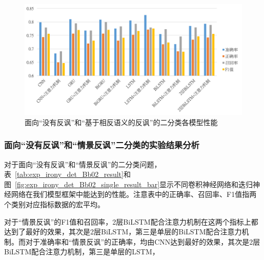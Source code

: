 \begin{figure}[H]
  \centering
  \includegraphics[width=\textwidth]{img/exp_irony_det_Bb01_single_result_bar.png}
  \caption{面向“没有反讽”和“基于相反语义的反讽”的二分类各模型性能}
  \label{fig:exp_irony_det_Bb01_single_result_bar}
\end{figure}

\subsubsection{面向“没有反讽”和“情景反讽”二分类的实验结果分析}

对于面向“没有反讽”和“情景反讽”的二分类问题，表~\ref{tab:exp_irony_det_Bb02_result}和图~\ref{fig:exp_irony_det_Bb02_single_result_bar}显示不同卷积神经网络和迭归神经网络在我们模型框架中能达到的性能。注意表中的正确率、召回率、F1值指两个类别对应指标数据的宏平均。

对于“情景反讽”的F1值和召回率，2层BiLSTM配合注意力机制在这两个指标上都达到了最好的效果，其次是2层BiLSTM，第三是单层的BiLSTM配合注意力机制。而对于准确率和“情景反讽”的正确率，均由CNN达到最好的效果，其次是2层BiLSTM配合注意力机制，第三是单层的LSTM，


